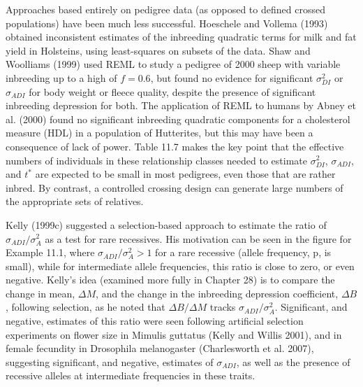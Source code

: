 \documentclass{article}
\begin{document}
Approaches based entirely on pedigree data (as opposed to defined crossed populations) have been much less successful. Hoeschele and Vollema (1993) obtained inconsistent estimates of the inbreeding quadratic terms for milk and fat yield in Holsteins, using least-squares on subsets of the data. Shaw and Woolliams (1999) used REML to study a pedigree of 2000 sheep with variable inbreeding up to a high of $f = 0.6$, but found no evidence for significant $\sigma_{D I}^{2}$ or $\sigma_{A D I}$ for body weight or fleece quality, despite the presence of significant inbreeding depression for both. The application of REML to humans by Abney et al. (2000) found no significant inbreeding quadratic components for a cholesterol measure (HDL) in a population of Hutterites, but this may have been a consequence of lack of power. Table 11.7 makes the key point that the effective numbers of individuals in these relationship classes needed to estimate $\sigma_{D I}^{2}$, $\sigma_{A D I}$, and $t^{*}$ are expected to be small in most pedigrees, even those that are rather inbred. By contrast, a controlled crossing design can generate large numbers of the appropriate sets of relatives.

Kelly (1999c) suggested a selection-based approach to estimate the ratio of  $ \sigma_{ADI}/\sigma_A^2 $ as a test for rare recessives. His motivation can be seen in the figure for Example 11.1, where  $ \sigma_{ADI}/\sigma_A^2 > 1 $ for a rare recessive (allele frequency, p, is small), while for intermediate allele frequencies, this ratio is close to zero, or even negative. Kelly's idea (examined more fully in Chapter 28) is to compare the change in mean,  $ \Delta M $, and the change in the inbreeding depression coefficient,  $ \Delta B $, following selection, as he noted that  $ \Delta B/\Delta M $ tracks  $ \sigma_{ADI}/\sigma_A^2 $. Significant, and negative, estimates of this ratio were seen following artificial selection experiments on flower size in Mimulis guttatus (Kelly and Willis 2001), and in female fecundity in Drosophila melanogaster (Charlesworth et al. 2007), suggesting significant, and negative, estimates of  $ \sigma_{ADI} $, as well as the presence of recessive alleles at intermediate frequencies in these traits.
\end{document}
